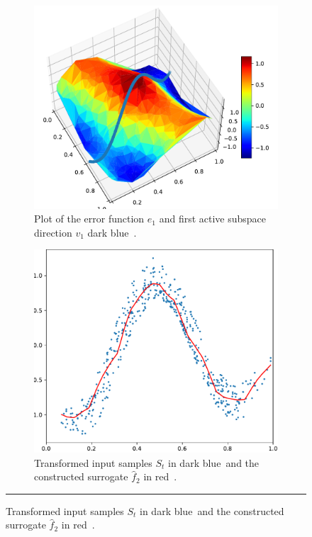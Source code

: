 \documentclass[
  a4paper,  %
  twoside,  %
  bibliography=totoc,
  headsepline,
  cleardoublepage=empty,
  parskip=half,
  draft=false
]{scrbook}
\newcommand{\Hsquare}{%
  \text{\fboxsep=-.2pt\fbox{\rule{0pt}{1.4ex}\rule{1.4ex}{0pt}}}%
}
\newcommand\red{red\,{\setlength\fboxsep{0pt}\colorbox{persian_red}{\Hsquare}} }
\newcommand\darkblue{dark blue\,{\setlength\fboxsep{0pt}\colorbox{charcoal}{\Hsquare}} }
\newcommand{\delimit}{{\color{silver}\noindent\rule{\textwidth}{1pt}}}
\begin{document}
\begin{mdframed}[style=style]
\begin{figure}[H]
\begin{subfigure}{.5\textwidth}
  \centering
  \includegraphics[width=.8\linewidth]{graphics/pipeline_current_2}
  \caption{Plot of the error function $e_1$ and first active subspace direction $v_1$ \darkblue.}
\label{fig:pipeline_current_2}
\end{subfigure}%
\begin{subfigure}{.5\textwidth}
  \centering
  \includegraphics[width=.8\linewidth]{graphics/pipeline_local_2}
  \caption{Transformed input samples $S_t$ in \darkblue and the constructed surrogate $\hat{f}_2$ in \red.}
\label{fig:pipeline_local_2}
\end{subfigure}
\delimit
{}
\label{fig:pipeline_2}
\end{figure}
\end{mdframed}
\end{document}
